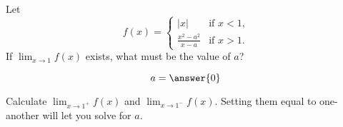 \documentclass{ximera}
\author{Steven Gubkin}
\begin{document}
\begin{exercise}

Let
\[
f(x) = \begin{cases}
  |x| &\text{if $x<1$,} \\
  \frac{x^2-a^2}{x-a} &\text{if $x>1$.}
\end{cases}
\]
If $\lim_{x \to 1} f(x)$ exists, what must be the value of $a$?
\begin{prompt}
  \[
a = \answer{0}
\]
\end{prompt}
\begin{hint}
  Calculate $\displaystyle \lim_{x\to 1^+}f(x)$ and $\displaystyle \lim_{x\to 1^-}f(x)$. Setting them equal to one-another will let you solve for $a$.
\end{hint}

\end{exercise}
\end{document}
